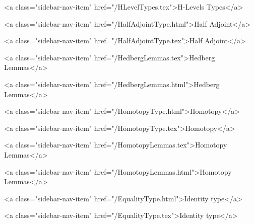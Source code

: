       
        
          <a class="sidebar-nav-item" href="/HLevelTypes.tex">H-Levels Types</a>
        
      
    
      
        
          <a class="sidebar-nav-item" href="/HalfAdjointType.html">Half Adjoint</a>
        
      
    
      
        
          <a class="sidebar-nav-item" href="/HalfAdjointType.tex">Half Adjoint</a>
        
      
    
      
        
          <a class="sidebar-nav-item" href="/HedbergLemmas.tex">Hedberg Lemmas</a>
        
      
    
      
        
          <a class="sidebar-nav-item" href="/HedbergLemmas.html">Hedberg Lemmas</a>
        
      
    
      
        
          <a class="sidebar-nav-item" href="/HomotopyType.html">Homotopy</a>
        
      
    
      
        
          <a class="sidebar-nav-item" href="/HomotopyType.tex">Homotopy</a>
        
      
    
      
        
          <a class="sidebar-nav-item" href="/HomotopyLemmas.tex">Homotopy Lemmas</a>
        
      
    
      
        
          <a class="sidebar-nav-item" href="/HomotopyLemmas.html">Homotopy Lemmas</a>
        
      
    
      
        
          <a class="sidebar-nav-item" href="/EqualityType.html">Identity type</a>
        
      
    
      
        
          <a class="sidebar-nav-item" href="/EqualityType.tex">Identity type</a>
        
      
    
